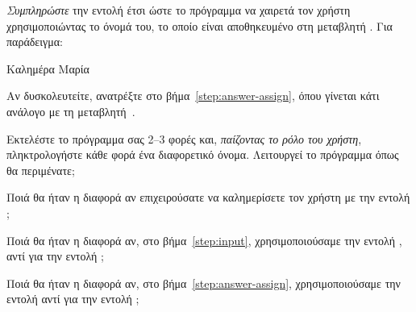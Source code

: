 \documentclass[a4paper,11pt,oneside]{book}
\begin{document}
\begin{step}
\emph{Συμπληρώστε} την εντολή  έτσι ώστε το πρόγραμμα να χαιρετά τον χρήστη χρησιμοποιώντας το όνομά του, το οποίο είναι αποθηκευμένο στη μεταβλητή . Για παράδειγμα:

\marginnote[16pt]{\iconcomputer\hspace{1ex}}%
\begin{pyterm}
Καλημέρα Μαρία
\end{pyterm}

Αν δυσκολευτείτε, ανατρέξτε στο βήμα~\ref{step:answer-assign}, όπου γίνεται κάτι ανάλογο με τη μεταβλητή~.

Εκτελέστε το πρόγραμμα σας 2--3 φορές και, \emph{παίζοντας το ρόλο του χρήστη}, πληκτρολογήστε κάθε φορά ένα διαφορετικό όνομα. Λειτουργεί το πρόγραμμα όπως θα περιμένατε;

\marginnote[14pt]{\icondiscuss}
\dottedline

Ποιά θα ήταν η διαφορά αν επιχειρούσατε να καλημερίσετε τον χρήστη με την εντολή ;

\marginnote[14pt]{\icondiscuss}
\dottedline

\dottedline

Ποιά θα ήταν η διαφορά αν, στο βήμα~\ref{step:input}, χρησιμοποιούσαμε την εντολή , αντί για την εντολή ;

\marginnote[14pt]{\icondiscuss}
\dottedline

\dottedline

Ποιά θα ήταν η διαφορά αν, στο βήμα~\ref{step:answer-assign}, χρησιμοποιούσαμε την εντολή  αντί για την εντολή ;

\marginnote[14pt]{\icondiscuss}
\dottedline

\dottedline
\end{step}



\end{document}
